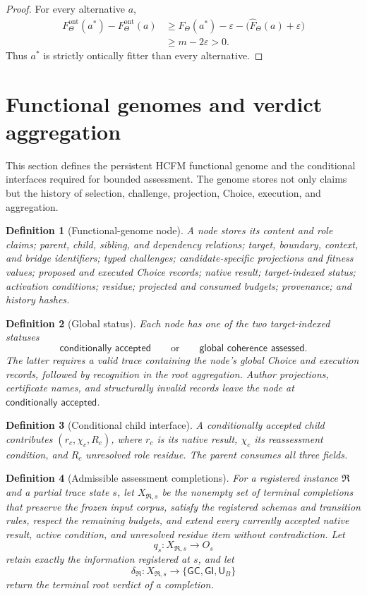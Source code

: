 \documentclass[10pt]{article}
\newtheorem{definition}{Definition}[section]
\newcommand{\GC}{\mathsf{GC}}
\newcommand{\GI}{\mathsf{GI}}
\newcommand{\UB}{\mathsf{U}_B}
\newcommand{\CA}{\textsf{conditionally accepted}}
\newcommand{\GCS}{\textsf{global coherence assessed}}
\newcommand{\ProjFit}{\widehat F}
\newcommand{\OntFit}{F^{\mathrm{ont}}}
\newcommand{\Target}{\Theta}
\begin{document}
\begin{proof}
For every alternative $a$,
\[
\begin{aligned}
  \OntFit_\Target(a^*)-\OntFit_\Target(a)
  &\ge \ProjFit_\Target(a^*)-\varepsilon
      -\bigl(\ProjFit_\Target(a)+\varepsilon\bigr)\\
  &\ge m-2\varepsilon>0.
\end{aligned}
\]
Thus $a^*$ is strictly ontically fitter than every alternative.
\end{proof}


\section{Functional genomes and verdict aggregation}

This section defines the persistent HCFM functional genome and the conditional interfaces required for bounded assessment.  The genome stores not only claims but the history of selection, challenge, projection, Choice, execution, and aggregation.

\begin{definition}[Functional-genome node]
A node stores its content and role claims; parent, child, sibling, and dependency relations; target, boundary, context, and bridge identifiers; typed challenges; candidate-specific projections and fitness values; proposed and executed Choice records; native result; target-indexed status; activation conditions; residue; projected and consumed budgets; provenance; and history hashes.
\end{definition}

\begin{definition}[Global status]
Each node has one of the two target-indexed statuses
\[
  \CA \qquad\text{or}\qquad \GCS.
\]
The latter requires a valid trace containing the node's global Choice and execution records, followed by recognition in the root aggregation.  Author projections, certificate names, and structurally invalid records leave the node at $\CA$.
\end{definition}

\begin{definition}[Conditional child interface]
A conditionally accepted child contributes $(r_c,\chi_c,R_c)$, where $r_c$ is its native result, $\chi_c$ its reassessment condition, and $R_c$ unresolved role residue.  The parent consumes all three fields.
\end{definition}

\begin{definition}[Admissible assessment completions]
For a registered instance $\mathfrak R$ and a partial trace state $s$, let $X_{\mathfrak R,s}$ be the nonempty set of terminal completions that preserve the frozen input corpus, satisfy the registered schemas and transition rules, respect the remaining budgets, and extend every currently accepted native result, active condition, and unresolved residue item without contradiction.  Let
\[
 q_s:X_{\mathfrak R,s}\to O_s
\]
retain exactly the information registered at $s$, and let
\[
 \delta_{\mathfrak R}:X_{\mathfrak R,s}\to\{\GC,\GI,\UB\}
\]
return the terminal root verdict of a completion.
\end{definition}
\end{document}
